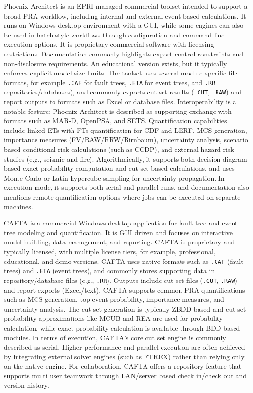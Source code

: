 Phoenix Architect \cite{phoenix_architect_v2} is an EPRI managed commercial toolset intended to support a broad PRA workflow, including internal and external event based calculations. It runs on Windows desktop environment with a GUI, while some engines can also be used in batch style workflows through configuration and command line execution options. It is proprietary commercial software with licensing restrictions. Documentation commonly highlights export control constraints and non-disclosure requirements. An educational version exists, but it typically enforces explicit model size limits. The toolset \cite{phoenix_architect_v2_appendices} uses several module specific file formats, for example \texttt{.CAF} for fault trees, \texttt{.ETA} for event trees, and \texttt{.RR} repositories/databases), and commonly exports cut set results (\texttt{.CUT}, \texttt{.RAW}) and report outputs to formats such as Excel or database files. Interoperability is a notable feature: Phoenix Architect is described as supporting exchange with formats such as MAR-D, OpenPSA, and SETS. Quantification capabilities include linked ETs with FTs quantification for CDF and LERF, MCS generation, importance measures (FV/RAW/RRW/Birnbaum), uncertainty analysis, scenario based conditional risk calculations (such as CCDP), and external hazard risk studies (e.g., seismic and fire). Algorithmically, it supports both decision diagram based exact probability computation and cut set based calculations, and uses Monte Carlo or Latin hypercube sampling for uncertainty propagation. In execution mode, it supports both serial and parallel runs, and documentation also mentions remote quantification options where jobs can be executed on separate machines.

CAFTA \cite{cafta_1987, cafta_1989, cafta_10, phoenix_architect_v2_appendices}  is a commercial Windows desktop application for fault tree and event tree modeling and quantification. It is GUI driven and focuses on interactive model building, data management, and reporting. CAFTA is proprietary and typically licensed, with multiple license tiers, for example, professional, educational, and demo versions. CAFTA uses native formats such as \texttt{.CAF} (fault trees) and \texttt{.ETA} (event trees), and commonly stores supporting data in repository/database files (e.g., \texttt{.RR}). Outputs include cut set files (\texttt{.CUT}, \texttt{.RAW}) and report exports (Excel/text). CAFTA supports common PRA quantifications such as MCS generation, top event probability, importance measures, and uncertainty analysis. The cut set generation is typically ZBDD based and cut set probability approximations like MCUB and REA are used for probability calculation, while exact probability calculation is available through BDD based modules. In terms of execution, CAFTA’s core cut set engine is commonly described as serial. Higher performance and parallel execution are often achieved by integrating external solver engines (such as FTREX) rather than relying only on the native engine. For collaboration, CAFTA offers a repository feature that supports multi user teamwork through LAN/server based check in/check out and version history.

